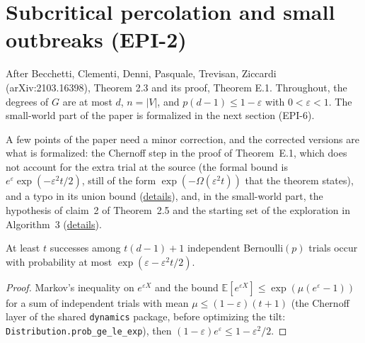 \section{Subcritical percolation and small outbreaks (EPI-2)}\label{sec:bcdptz-small-world}
After Becchetti, Clementi, Denni, Pasquale, Trevisan, Ziccardi (arXiv:2103.16398), Theorem 2.3
and its proof, Theorem E.1. Throughout, the degrees of $G$ are at most $d$, $n = |V|$, and
$p(d-1) \le 1 - \varepsilon$ with $0 < \varepsilon < 1$. The small-world part of the paper is
formalized in the next section (EPI-6).

A few points of the paper need a minor correction, and the corrected versions are what is
formalized: the Chernoff step in the proof of Theorem~E.1, which does not account for the extra
trial at the source (the formal bound is $e^{\varepsilon}\exp(-\varepsilon^2 t/2)$, still of the
form $\exp(-\Omega(\varepsilon^2 t))$ that the theorem states), and a typo in its union bound
(\href{https://github.com/formal-dynamics/leanamics/blob/main/epidemics/FORMALIZATION_DIFFERENCES.md#subcritical-percolation-and-small-outbreaks-subcritical-epi-2}{details}),
and, in the small-world part, the hypothesis of claim~2 of Theorem~2.5 and the starting set of
the exploration in Algorithm~3
(\href{https://github.com/formal-dynamics/leanamics/blob/main/epidemics/FORMALIZATION_DIFFERENCES.md#small-world-networks-below-the-percolation-threshold-smallworld-epi-6}{details}).

\begin{lemma}\label{lem:chernoff}
\leanok{}
At least $t$ successes among $t(d-1)+1$ independent Bernoulli$(p)$ trials occur with probability
at most $\exp(\varepsilon - \varepsilon^2 t/2)$.
\end{lemma}
\begin{proof}\leanok
Markov's inequality on $e^{\varepsilon X}$ and the bound $\mathbb E[e^{\varepsilon X}] \le
\exp(\mu(e^{\varepsilon}-1))$ for a sum of independent trials with mean $\mu \le
(1-\varepsilon)(t+1)$ (the Chernoff layer of the shared \texttt{dynamics} package, before
optimizing the tilt: \texttt{Distribution.prob\_ge\_le\_exp}), then $(1-\varepsilon)e^{\varepsilon} \le 1 - \varepsilon^2/2$.
\end{proof}

